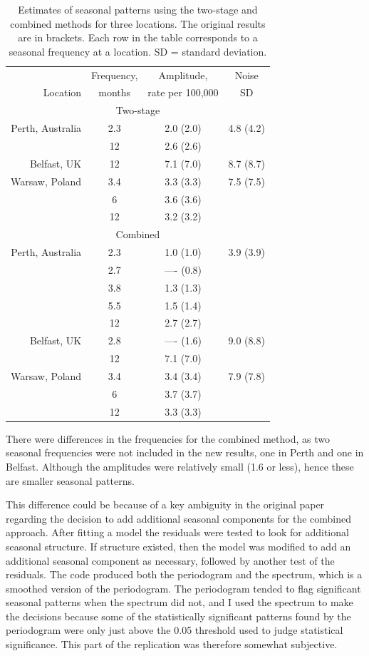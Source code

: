 \begin{table}[!h]
  \centering
  \begin{tabular}{rccc}\hline
 & Frequency,  & Amplitude,  &  Noise \\ 
Location & months & rate per 100,000 &  SD \\ \hline
\multicolumn{4}{c}{Two-stage} \\ \hline
Perth, Australia & 2.3 & 2.0 (2.0) & 4.8 (4.2)\\
 & 12 & 2.6 (2.6) \\
Belfast, UK & 12 & 7.1 (7.0) & 8.7 (8.7) \\ 
Warsaw, Poland & 3.4 & 3.3 (3.3) & 7.5 (7.5)\\
               & 6  & 3.6 (3.6)\\ 
               & 12 & 3.2 (3.2)\\
\hline
\multicolumn{4}{c}{Combined}  \\ \hline
Perth, Australia & 2.3 & 1.0 (1.0) & 3.9 (3.9)\\
 & 2.7 & ---- (0.8) \\
 & 3.8 & 1.3 (1.3)\\
 & 5.5 & 1.5 (1.4)\\
 & 12 & 2.7 (2.7)\\
Belfast, UK & 2.8 & ---- (1.6) & 9.0 (8.8) \\
            & 12 & 7.1 (7.0) &  \\ 
Warsaw, Poland & 3.4 & 3.4 (3.4) & 7.9 (7.8)\\
               & 6  & 3.7 (3.7)\\ 
               & 12 & 3.3 (3.3)\\
\hline
\end{tabular}
 \caption{Estimates of seasonal patterns using the two-stage and combined methods for three locations. The original results are in brackets. Each row in the table corresponds to a seasonal frequency at a location. SD = standard deviation.}
  \label{tab:season}  
\end{table}

There were differences in the frequencies for the combined method, as two seasonal frequencies were not included in the new results, one in Perth and one in Belfast. Although the amplitudes were relatively small (1.6 or less), hence these are smaller seasonal patterns.

This difference could be because of a key ambiguity in the original paper regarding the decision to add additional seasonal components for the combined approach. After fitting a model the residuals were tested to look for additional seasonal structure. If structure existed, then the model was modified to add an additional seasonal component as necessary, followed by another test of the residuals. The code produced both the periodogram and the spectrum, which is a smoothed version of the periodogram. The periodogram tended to flag significant seasonal patterns when the spectrum did not, and I used the spectrum to make the decisions because some of the statistically significant patterns found by the periodogram were only just above the 0.05 threshold used to judge statistical significance. This part of the replication was therefore somewhat subjective.

